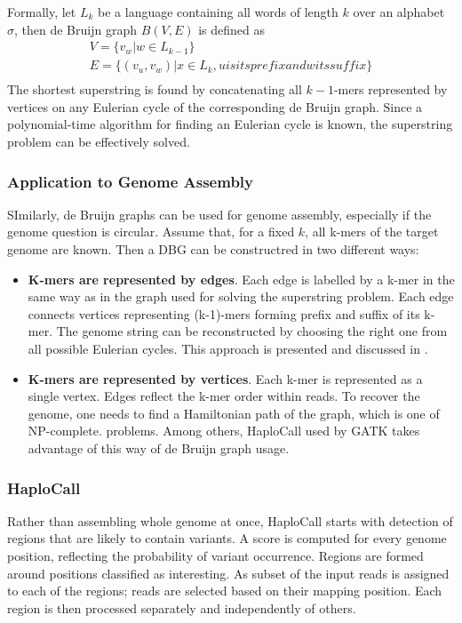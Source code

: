 Formally, let $L_k$ be a language containing all words of length $k$ over an alphabet $\sigma$, then de Bruijn graph $B(V, E)$ is defined as
\begin{gather}
V = \{v_w | w \in L_{k-1}\} \\
E = \{(v_u, v_w) | x \in L_k,  u is its prefix and w its suffix \} \\
\end{gather}
The shortest superstring is found by concatenating all $k-1$-mers represented by vertices on any Eulerian cycle of the corresponding de Bruijn graph. Since a polynomial-time algorithm for finding an Eulerian cycle is known, the superstring problem can be effectively solved.

\subsubsection{Application to Genome Assembly}
\label{subsub:dbg-application-to-genome-assembly}

SImilarly, de Bruijn graphs can be used for genome assembly, especially if the genome question is circular. Assume that, for a fixed $k$, all k-mers of the target genome are known. Then a DBG can be constructred in two different ways:
\begin{itemize}
\item \textbf{K-mers are represented by edges}. Each edge is labelled by a k-mer in the same way as in the graph used for solving the superstring problem. Each edge connects vertices representing (k-1)-mers forming prefix and suffix of its k-mer. The genome string can be reconstructed by choosing the right one from all possible Eulerian cycles. This approach is presented and discussed in \cite{dbg-apply}.
\item \textbf{K-mers are represented by vertices}. Each k-mer is represented as a single vertex. Edges reflect the k-mer order within reads. To recover the genome, one needs to find a Hamiltonian path of the graph, which is one of NP-complete. problems. Among others, HaploCall \cite{haplocall} used by GATK takes advantage of this way of de Bruijn graph usage.
\end{itemize}

\subsubsection{HaploCall}
\label{subsub:haplocall}

Rather than assembling whole genome at once, HaploCall starts with detection of regions that are likely to contain variants\cite{haplocall-1}. A score is computed for every genome position, reflecting the probability of variant occurrence. Regions are formed around positions classified as interesting. As subset of the input reads is assigned to each of the regions; reads are selected based on their mapping position. Each region is then processed separately and independently of others.


